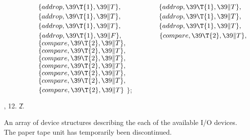 ${}\hbox{\>}\{\\{addrop},\39\T{1},\39\|T\},{}$\6
${}\hbox{\>}\{\\{addrop},\39\T{1},\39\|T\},{}$\6
${}\hbox{\>}\{\\{addrop},\39\T{1},\39\|T\},{}$\6
${}\hbox{\>}\{\\{addrop},\39\T{1},\39\|T\},{}$\6
${}\hbox{\>}\{\\{addrop},\39\T{1},\39\|T\},{}$\6
${}\hbox{\>}\{\\{addrop},\39\T{1},\39\|T\},{}$\6
${}\hbox{\>}\{\\{addrop},\39\T{1},\39\|F\},{}$\6
${}\hbox{\>}\{\\{compare},\39\T{2},\39\|T\},{}$\6
${}\hbox{\>}\{\\{compare},\39\T{2},\39\|T\},{}$\6
${}\hbox{\>}\{\\{compare},\39\T{2},\39\|T\},{}$\6
${}\hbox{\>}\{\\{compare},\39\T{2},\39\|T\},{}$\6
${}\hbox{\>}\{\\{compare},\39\T{2},\39\|T\},{}$\6
${}\hbox{\>}\{\\{compare},\39\T{2},\39\|T\},{}$\6
${}\hbox{\>}\{\\{compare},\39\T{2},\39\|T\},{}$\6
${}\hbox{\>}\{\\{compare},\39\T{2},\39\|T\}{}$\6
${}\}{}$;\par
{}, 12.
\U2.\fi

An array of device structures describing the each of the available
I/O devices.
The paper tape unit has temporarily been discontinued.

